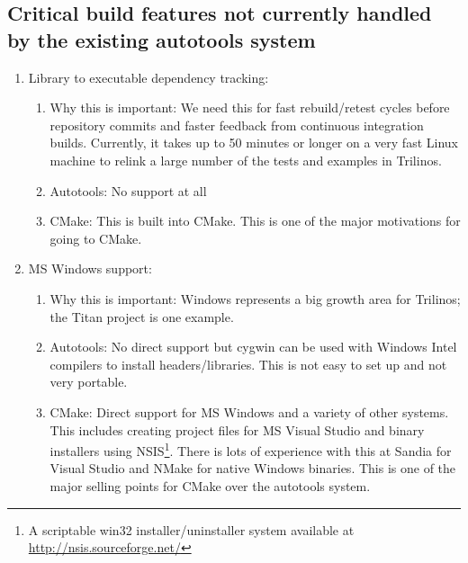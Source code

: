 \documentclass[pdf,ps2pdf,11pt]{SANDreport}
\begin{document}
%
{}\subsection{Critical build features not currently handled by the
existing autotools system}
%

\begin{enumerate}

{}\item Library to executable dependency tracking:

  \begin{enumerate}

  {}\item Why this is important: We need this for fast rebuild/retest
  cycles before repository commits and faster feedback from continuous
  integration builds.  Currently, it takes up to 50 minutes or longer
  on a very fast Linux machine to relink a large number of the tests
  and examples in Trilinos.

  {}\item Autotools: No support at all

  {}\item CMake: This is built into CMake.  This is one of the major
  motivations for going to CMake.

  \end{enumerate}

{}\item MS Windows support:

  \begin{enumerate}

  {}\item Why this is important: Windows represents a big growth area
  for Trilinos; the Titan project is one example.

  {}\item Autotools: No direct support but cygwin can be used with
  Windows Intel compilers to install headers/libraries.  This is not
  easy to set up and not very portable.

  {}\item CMake: Direct support for MS Windows and a variety of other
  systems.  This includes creating project files for MS Visual Studio
  and binary installers using NSIS\footnote{A scriptable win32
  installer/uninstaller system available at
  \url{http://nsis.sourceforge.net/}}.  There is lots of experience
  with this at Sandia for Visual Studio and NMake for native Windows
  binaries.  This is one of the major selling points for CMake over
  the autotools system.


\end{enumerate}
\end{enumerate}
\end{document}

